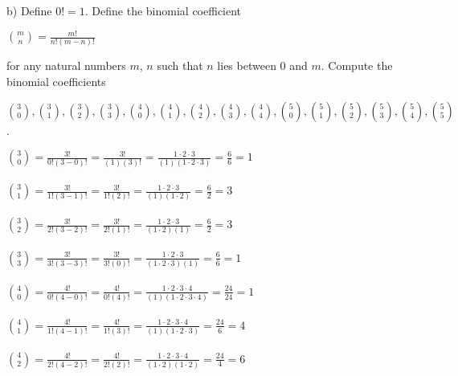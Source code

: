 \documentclass[12pt]{article}
\begin{document}
b) Define $0!=1$. Define the binomial coefficient
\begin{center}
$\displaystyle \binom{m}{n}=\displaystyle \frac{m!}{n!(m-n)!}$
\end{center}
for any natural numbers $m$, $n$ such that $n$ lies between 0 and $m$. Compute the binomial coefficients
\begin{center}
$\displaystyle \binom{3}{0}, \displaystyle \binom{3}{1}, \displaystyle \binom{3}{2}, \displaystyle \binom{3}{3}, \displaystyle \binom{4}{0}, \displaystyle \binom{4}{1}, \displaystyle \binom{4}{2}, \displaystyle \binom{4}{3}, \displaystyle \binom{4}{4}, \displaystyle \binom{5}{0}, \displaystyle \binom{5}{1}, \displaystyle \binom{5}{2}, \displaystyle \binom{5}{3}, \displaystyle \binom{5}{4}, \displaystyle \binom{5}{5}$.
\end{center}
\begin{center}
$\displaystyle \binom{3}{0}=\displaystyle \frac{3!}{0!(3-0)!}=\displaystyle \frac{3!}{(1)(3)!}=\displaystyle \frac{1\cdot2\cdot3}{(1)(1\cdot2\cdot3)}=\displaystyle \frac{6}{6}=1$ \\
~ \\
$\displaystyle \binom{3}{1}=\displaystyle \frac{3!}{1!(3-1)!}=\displaystyle \frac{3!}{1!(2)!}=\displaystyle \frac{1\cdot2\cdot3}{(1)(1\cdot2)}=\displaystyle \frac{6}{2}=3$ \\
~ \\
$\displaystyle \binom{3}{2}=\displaystyle \frac{3!}{2!(3-2)!}=\displaystyle \frac{3!}{2!(1)!}=\displaystyle \frac{1\cdot2\cdot3}{(1\cdot2)(1)}=\displaystyle \frac{6}{2}=3$ \\
~ \\
$\displaystyle \binom{3}{3}=\displaystyle \frac{3!}{3!(3-3)!}=\displaystyle \frac{3!}{3!(0)!}=\displaystyle \frac{1\cdot2\cdot3}{(1\cdot2\cdot3)(1)}=\displaystyle \frac{6}{6}=1$ \\
~ \\
$\displaystyle \binom{4}{0}=\displaystyle \frac{4!}{0!(4-0)!}=\displaystyle \frac{4!}{0!(4)!}=\displaystyle \frac{1\cdot2\cdot3\cdot4}{(1)(1\cdot2\cdot3\cdot4)}=\displaystyle \frac{24}{24}=1$ \\
~ \\
$\displaystyle \binom{4}{1}=\displaystyle \frac{4!}{1!(4-1)!}=\displaystyle \frac{4!}{1!(3)!}=\displaystyle \frac{1\cdot2\cdot3\cdot4}{(1)(1\cdot2\cdot3)}=\displaystyle \frac{24}{6}=4$ \\
~ \\
$\displaystyle \binom{4}{2}=\displaystyle \frac{4!}{2!(4-2)!}=\displaystyle \frac{4!}{2!(2)!}=\displaystyle \frac{1\cdot2\cdot3\cdot4}{(1\cdot2)(1\cdot2)}=\displaystyle \frac{24}{4}=6$ \\

\end{center}
\end{document}
